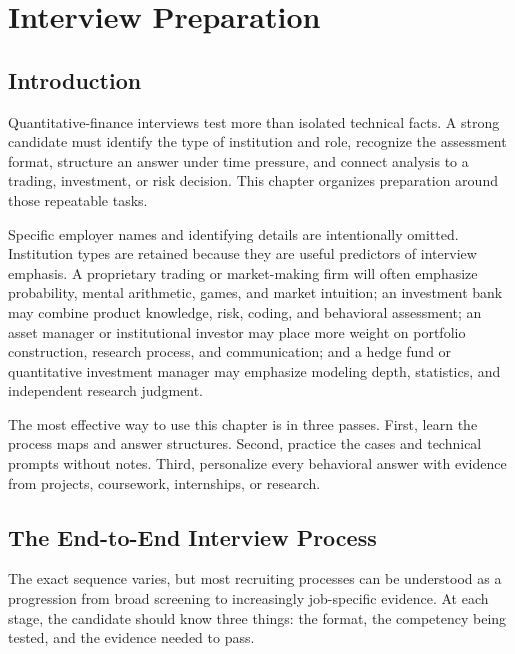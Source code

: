 \documentclass[11pt,letterpaper,openany]{book}
\begin{document}
\setcounter{chapter}{11}
\chapter{Interview Preparation}

\section{Introduction}
Quantitative-finance interviews test more than isolated technical facts. A strong candidate must identify the type of institution and role, recognize the assessment format, structure an answer under time pressure, and connect analysis to a trading, investment, or risk decision. This chapter organizes preparation around those repeatable tasks.

Specific employer names and identifying details are intentionally omitted. Institution types are retained because they are useful predictors of interview emphasis. A proprietary trading or market-making firm will often emphasize probability, mental arithmetic, games, and market intuition; an investment bank may combine product knowledge, risk, coding, and behavioral assessment; an asset manager or institutional investor may place more weight on portfolio construction, research process, and communication; and a hedge fund or quantitative investment manager may emphasize modeling depth, statistics, and independent research judgment.

The most effective way to use this chapter is in three passes. First, learn the process maps and answer structures. Second, practice the cases and technical prompts without notes. Third, personalize every behavioral answer with evidence from projects, coursework, internships, or research.
\section{The End-to-End Interview Process}
The exact sequence varies, but most recruiting processes can be understood as a progression from broad screening to increasingly job-specific evidence. At each stage, the candidate should know three things: the format, the competency being tested, and the evidence needed to pass.
\end{document}
